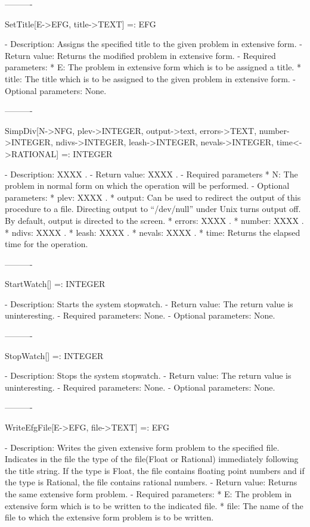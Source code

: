 \begin{itemize}
----------

SetTitle[E->EFG, title->TEXT] =: EFG

   -	Description:  Assigns the specified title to the given problem in 
	extensive form.
   -	Return value:  Returns the modified problem in extensive form.
   -	Required parameters:
	  *  E:  The problem in extensive form which is to be assigned a title.
	  *  title:  The title which is to be assigned to the given problem in 
		extensive form.
  -	Optional parameters:  None.

----------

SimpDiv[N->NFG, {plev->INTEGER}, {output->text}, {errors->TEXT},
	{number->INTEGER}, {ndivs->INTEGER}, {leash->INTEGER}, 
	{nevals->INTEGER}, {time<->RATIONAL}] =: INTEGER

   -	Description:  XXXX .
   -	Return value:  XXXX .
   -	Required parameters
	  *  N:  The problem in normal form on which the operation will be 
		performed.
   -	Optional parameters:
	  *  plev: XXXX .
	  *  output:  Can be used to redirect the output of this procedure to a
		file.  Directing output to ``/dev/null'' under Unix turns 
		output off.  By default, output is directed to the screen.
	  *  errors:  XXXX .
	  *  number:  XXXX .
	  *  ndivs:  XXXX .
	  *  leash:  XXXX .
	  *  nevals:  XXXX .
	  *  time:  Returns the elapsed time for the operation.

----------

StartWatch[] =: INTEGER

   -	Description:  Starts the system stopwatch.  
   -	Return value:  The return value is uninteresting.
   -	Required parameters:  None.
   -	Optional parameters:  None.

----------

StopWatch[] =: INTEGER

   -	Description:  Stops the system stopwatch.  
   -	Return value:  The return value is uninteresting.
   -	Required parameters:  None.
   -	Optional parameters:  None.

----------

WriteEfgFile[E->EFG, file->TEXT] =: EFG

   -	Description:  Writes the given extensive form problem to the specified 
	file.  Indicates in the file the type of the file(Float or Rational) 
	immediately following the title string.  If the type is Float, the file
	contains floating point numbers and if the type is Rational, the file
	contains rational numbers.  
   -	Return value:  Returns the same extensive form problem.
   -	Required parameters:
	  *  E:  The problem in extensive form which is to be written to the
		indicated file.
	  *  file:  The name of the file to which the extensive form problem is
		to be written.


\end{itemize}
